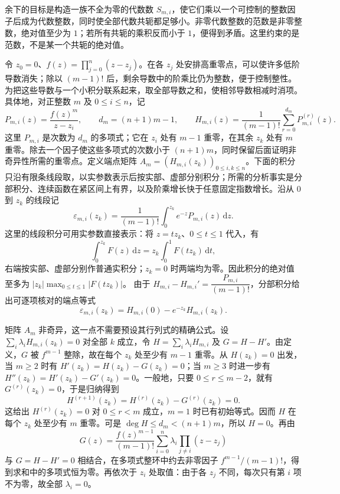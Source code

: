 \begin{proofsketch}
	余下的目标是构造一族不全为零的代数数 \(S_{m,i}\)，使它们乘以一个可控制的整数因子后成为代数整数，同时使全部代数共轭都足够小。非零代数整数的范数是非零整数，绝对值至少为 \(1\)；若所有共轭的乘积反而小于 \(1\)，便得到矛盾。这里约束的是范数，不是某一个共轭的绝对值。

	令 \(z_0=0\)、\(f(z)=\prod_{j=0}^n(z-z_j)\)。在各 \(z_j\) 处安排高重零点，可以使许多低阶导数消失；除以 \((m-1)!\) 后，剩余导数中的阶乘比仍为整数，便于控制整性。为把这些导数与一个小积分联系起来，取全部导数之和，使相邻导数相减时消项。具体地，对正整数 \(m\) 及 \(0\le i\le n\)，记
	\[
		P_{m,i}(z)=\frac{f(z)^m}{z-z_i},\qquad d_m=(n+1)m-1,\qquad H_{m,i}(z)=\frac1{(m-1)!}\sum_{r=0}^{d_m}P_{m,i}^{(r)}(z).
	\]
	这里 \(P_{m,i}\) 是次数为 \(d_m\) 的多项式；它在 \(z_i\) 处有 \(m-1\) 重零，在其余 \(z_k\) 处有 \(m\) 重零。除去一个因子使这些多项式的次数小于 \((n+1)m\)，同时保留后面证明非奇异性所需的重零点。定义端点矩阵 \(A_m=(H_{m,i}(z_k))_{0\le i,k\le n}\)。下面的积分只沿有限条线段取，以实参数表示后按实部、虚部分别积分；所需的分析事实是分部积分、连续函数在紧区间上有界，以及阶乘增长快于任意固定指数增长。沿从 \(0\) 到 \(z_k\) 的线段记
	\[
		\varepsilon_{m,i}(z_k) =\frac1{(m-1)!}\int_0^{z_k}e^{-z}P_{m,i}(z)\,\mathrm{d}z.
	\]
	这里的线段积分可用实参数直接表示：将 \(z=tz_k\)、\(0\le t\le1\) 代入，有
	\[
		\int_0^{z_k}F(z)\,\mathrm{d}z =z_k\int_0^1F(tz_k)\,\mathrm{d}t,
	\]
	右端按实部、虚部分别作普通实积分；\(z_k=0\) 时两端均为零。因此积分的绝对值至多为 \(\lvert z_k\rvert\max_{0\le t\le1}\lvert F(tz_k)\rvert\)。 由于 \(H_{m,i}-H_{m,i}'=\dfrac{P_{m,i}}{(m-1)!}\)，分部积分给出可逐项核对的端点等式
	\[
		\varepsilon_{m,i}(z_k) =H_{m,i}(0)-e^{-z_k}H_{m,i}(z_k).
	\]

	矩阵 \(A_m\) 非奇异，这一点不需要预设其行列式的精确公式。设 \(\sum_i\lambda_iH_{m,i}(z_k)=0\) 对全部 \(k\) 成立，令 \(H=\sum_i\lambda_iH_{m,i}\) 及 \(G=H-H'\)。由定义，\(G\) 被 \(f^{m-1}\) 整除，故在每个 \(z_k\) 处至少有 \(m-1\) 重零。从 \(H(z_k)=0\) 出发，当 \(m\ge2\) 时有 \(H'(z_k)=H(z_k)-G(z_k)=0\)；当 \(m\ge3\) 时进一步有 \(H''(z_k)=H'(z_k)-G'(z_k)=0\)。一般地，只要 \(0\le r\le m-2\)，就有 \(G^{(r)}(z_k)=0\)，于是归纳得到
	\[
		H^{(r+1)}(z_k)=H^{(r)}(z_k)-G^{(r)}(z_k)=0.
	\]
	这给出 \(H^{(r)}(z_k)=0\) 对 \(0\le r<m\) 成立，\(m=1\) 时已有初始等式。因而 \(H\) 在每个 \(z_k\) 处至少有 \(m\) 重零。可是 \(\deg H\le d_m<(n+1)m\)，所以 \(H=0\)。再由
	\[
		G(z)=\frac{f(z)^{m-1}}{(m-1)!} \sum_{i=0}^n\lambda_i\prod_{j\ne i}(z-z_j)
	\]
	与 \(G=H-H'=0\) 相结合，在多项式整环中约去非零因子 \(f^{m-1}/(m-1)!\)，得到求和中的多项式恒为零。再依次于 \(z_i\) 处取值：由于各 \(z_j\) 不同，每次只有第 \(i\) 项不为零，故全部 \(\lambda_i=0\)。


\end{proofsketch}
